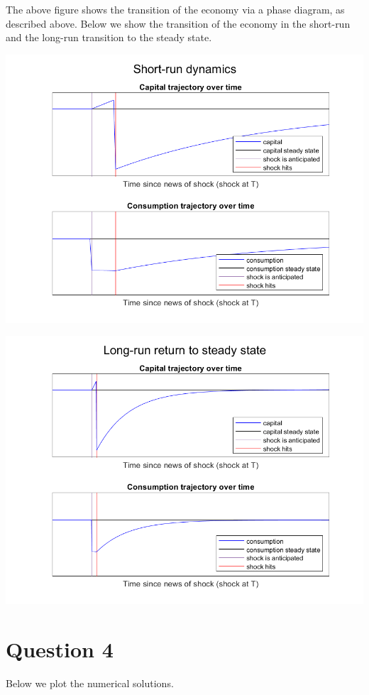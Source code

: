 \documentclass[11pt]{article} %
\begin{document}
The above figure shows the transition of the economy via a phase diagram, as described above. Below we show the transition of the economy in the short-run and the long-run transition to the steady state.

\includegraphics{shortrunnolab}

\includegraphics{longrunnolab}

\section{Question 4}

Below we plot the numerical solutions.
\end{document}

